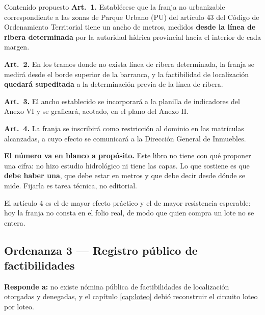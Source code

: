 \begin{ficha}{Contenido propuesto}
\textbf{Art.\ 1.} Establécese que la franja no urbanizable correspondiente a las zonas de
Parque Urbano (PU) del artículo 43 del Código de Ordenamiento Territorial tiene un ancho de
\underline{\hspace{1.5cm}} metros, medidos \textbf{desde la línea de ribera determinada} por
la autoridad hídrica provincial hacia el interior de cada margen.

\textbf{Art.\ 2.} En los tramos donde no exista línea de ribera determinada, la franja se
medirá desde el borde superior de la barranca, y la factibilidad de localización
\textbf{quedará supeditada} a la determinación previa de la línea de ribera.

\textbf{Art.\ 3.} El ancho establecido se incorporará a la planilla de indicadores del Anexo
VI y se graficará, acotado, en el plano del Anexo II.

\textbf{Art.\ 4.} La franja se inscribirá como restricción al dominio en las matrículas
alcanzadas, a cuyo efecto se comunicará a la Dirección General de Inmuebles.
\end{ficha}

\begin{cautela}
\textbf{El número va en blanco a propósito.} Este libro no tiene con qué proponer una cifra:
no hizo estudio hidrológico ni tiene las capas. Lo que sostiene es que \textbf{debe haber
una}, que debe estar en metros y que debe decir desde dónde se mide. Fijarla es tarea técnica,
no editorial.

El artículo 4 es el de mayor efecto práctico y el de mayor resistencia esperable: hoy la
franja no consta en el folio real, de modo que quien compra un lote no se entera.
\end{cautela}

\subsection{Ordenanza 3 --- Registro público de factibilidades}

\textbf{Responde a:} no existe nómina pública de factibilidades de localización otorgadas y
denegadas, y el capítulo \ref{cap:loteo} debió reconstruir el circuito loteo por loteo.

